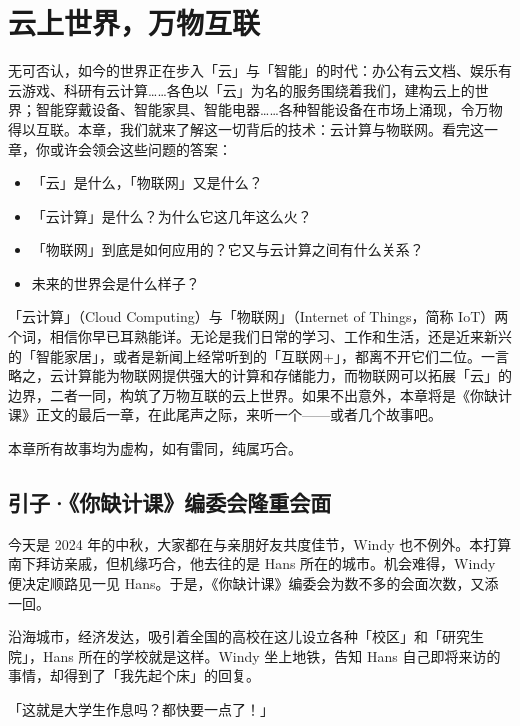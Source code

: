 \chapter{云上世界，万物互联}
\label{cha:cloud-computing-and-iot}

\begin{intro}
  无可否认，如今的世界正在步入「云」与「智能」的时代：办公有云文档、娱乐有云游戏、科研有云计算……各色以「云」为名的服务围绕着我们，建构云上的世界；智能穿戴设备、智能家具、智能电器……各种智能设备在市场上涌现，令万物得以互联。本章，我们就来了解这一切背后的技术：云计算与物联网。看完这一章，你或许会领会这些问题的答案：
  \begin{itemize}
    \item 「云」是什么，「物联网」又是什么？
    \item 「云计算」是什么？为什么它这几年这么火？
    \item 「物联网」到底是如何应用的？它又与云计算之间有什么关系？
    \item 未来的世界会是什么样子？
  \end{itemize}
\end{intro}

「云计算」（Cloud Computing）与「物联网」（Internet of Things，简称 IoT）两个词，相信你早已耳熟能详。无论是我们日常的学习、工作和生活，还是近来新兴的「智能家居」，或者是新闻上经常听到的「互联网+」，都离不开它们二位。一言略之，云计算能为物联网提供强大的计算和存储能力，而物联网可以拓展「云」的边界，二者一同，构筑了万物互联的云上世界。如果不出意外，本章将是《你缺计课》正文的最后一章，在此尾声之际，来听一个——或者几个故事吧。

\begin{note}
  本章所有故事均为虚构，如有雷同，纯属巧合。
\end{note}

\section{引子·《你缺计课》编委会隆重会面}

今天是 2024 年的中秋，大家都在与亲朋好友共度佳节，Windy 也不例外。本打算南下拜访亲戚，但机缘巧合，他去往的是 Hans 所在的城市。机会难得，Windy 便决定顺路见一见 Hans。于是，《你缺计课》编委会为数不多的会面次数，又添一回。

沿海城市，经济发达，吸引着全国的高校在这儿设立各种「校区」和「研究生院」，Hans 所在的学校就是这样。Windy 坐上地铁，告知 Hans 自己即将来访的事情，却得到了「我先起个床」的回复。

「这就是大学生作息吗？都快要一点了！」

